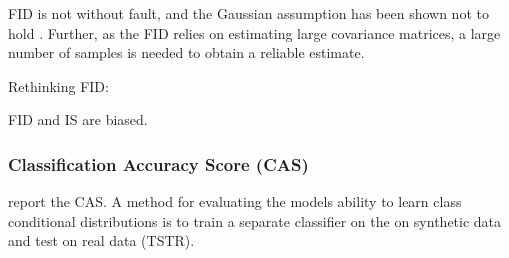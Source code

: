 \documentclass[../../thesis.tex]{subfiles}
\begin{document}
FID is not without fault, and the Gaussian assumption has been shown not to hold \cite{jayasumana2024rethinking}. Further, as the FID relies on estimating large covariance matrices, a large number of samples is needed to obtain a reliable estimate.\newline

Rethinking FID: \cite{jayasumana2024rethinking} 

\cite{chong2020effectively} FID and IS are biased.


\subsubsection{Classification Accuracy Score (CAS)}
\cite{smith2020conditional} report the CAS.
A method for evaluating the models ability to learn class conditional distributions is to train a separate classifier on the on synthetic data and test on real data (TSTR).  
\end{document}
